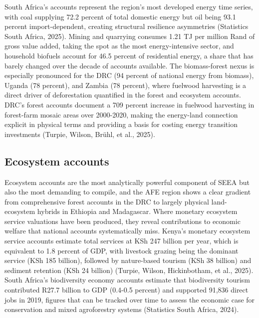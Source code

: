 \documentclass[
  letterpaper,
  DIV=11,
  numbers=noendperiod]{scrartcl}
\begin{document}
South Africa's accounts represent the region's most developed energy
time series, with coal supplying 72.2 percent of total domestic energy
but oil being 93.1 percent import-dependent, creating structural
resilience asymmetries (Statistics South Africa, 2025). Mining and
quarrying consumes 1.21 TJ per million Rand of gross value added, taking
the spot as the most energy-intensive sector, and household biofuels
account for 46.5 percent of residential energy, a share that has barely
changed over the decade of accounts available. The biomass-forest nexus
is especially pronounced for the DRC (94 percent of national energy from
biomass), Uganda (78 percent), and Zambia (78 percent), where fuelwood
harvesting is a direct driver of deforestation quantified in the forest
and ecosystem accounts. DRC's forest accounts document a 709 percent
increase in fuelwood harvesting in forest-farm mosaic areas over
2000-2020, making the energy-land connection explicit in physical terms
and providing a basis for costing energy transition investments (Turpie,
Wilson, Brühl, et al., 2025).

\subsection{Ecosystem accounts}\label{ecosystem-accounts}

Ecosystem accounts are the most analytically powerful component of SEEA
but also the most demanding to compile, and the AFE region shows a clear
gradient from comprehensive forest accounts in the DRC to largely
physical land-ecosystem hybrids in Ethiopia and Madagascar. Where
monetary ecosystem service valuations have been produced, they reveal
contributions to economic welfare that national accounts systematically
miss. Kenya's monetary ecosystem service accounts estimate total
services at KSh 247 billion per year, which is equivalent to 1.8 percent
of GDP, with livestock grazing being the dominant service (KSh 185
billion), followed by nature-based tourism (KSh 38 billion) and sediment
retention (KSh 24 billion) (Turpie, Wilson, Hickinbotham, et al., 2025).
South Africa's biodiversity economy accounts estimate that biodiversity
tourism contributed R27.7 billion to GDP (0.4-0.5 percent) and supported
91,836 direct jobs in 2019, figures that can be tracked over time to
assess the economic case for conservation and mixed agroforestry systems
(Statistics South Africa, 2024).
\end{document}
